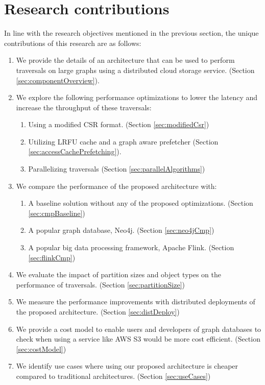 \section{Research contributions}
In line with the research objectives mentioned in the previous section, the 
unique contributions of this research are as follows:
\begin{enumerate}
    \item We provide the details of an architecture that can be used to perform 
        traversals on large graphs using a distributed cloud storage service. 
        (Section \ref{sec:componentOverview}). 
    \item We explore the following performance optimizations to lower the latency and
        increase the throughput of these traversals:
        \begin{enumerate}
            \item Using a modified CSR format. (Section \ref{sec:modifiedCsr})
            \item Utilizing LRFU cache and a graph aware prefetcher 
                (Section \ref{sec:accessCachePrefetching}).
            \item Parallelizing traversals (Section
                \ref{sec:parallelAlgorithms})
        \end{enumerate}
    \item We compare the performance of the proposed architecture with:
        \begin{enumerate}
            \item A baseline solution without any of the proposed optimizations.
                (Section \ref{sec:cmpBaseline})
            \item A popular graph database, Neo4j. (Section \ref{sec:neo4jCmp})
            \item A popular big data processing framework, Apache Flink.
                (Section \ref{sec:flinkCmp})
        \end{enumerate}
    \item We evaluate the impact of partition sizes and object types on the performance of
        traversals. (Section \ref{sec:partitionSize})
    \item We measure the performance improvements with distributed deployments
        of the proposed architecture. (Section \ref{sec:distDeploy})
    \item We provide a cost model to enable users and developers of graph
        databases to check when using a service like AWS S3 would be more cost
        efficient. (Section \ref{sec:costModel})
    \item We identify use cases where using our proposed architecture is
        cheaper compared to traditional architectures. (Section \ref{sec:useCases})
\end{enumerate}


